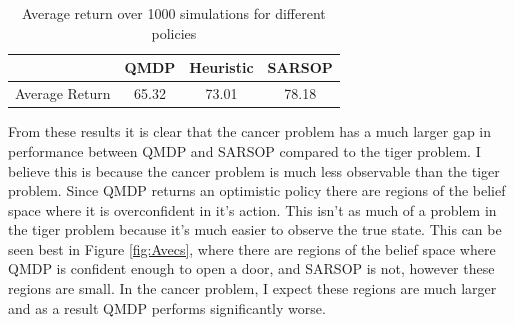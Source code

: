 \documentclass[11pt]{article}
\begin{document}
\section{}

\begin{table}[H]
    \centering
    \begin{tabular}{c|ccc}
    \hline
    & QMDP & Heuristic & SARSOP \\
    \hline
    Average Return & 65.32 & 73.01 & 78.18 \\
    \hline
    \end{tabular}
    \caption{Average return over 1000 simulations for different policies}
    \label{tab:policy_results}
\end{table}

From these results it is clear that the cancer problem has a much larger gap in performance between QMDP and SARSOP compared to the tiger problem. I believe this is because
the cancer problem is much less observable than the tiger problem. Since QMDP returns an optimistic policy there are regions of the belief space where it is overconfident in it's action.
This isn't as much of a problem in the tiger problem because it's much easier to observe the true state. This can be seen best in Figure \ref{fig:Avecs}, where there are regions of the belief space where QMDP is confident enough to open a door, and SARSOP is not, however these regions are small.
In the cancer problem, I expect these regions are much larger and as a result QMDP performs significantly worse.
\end{document}
